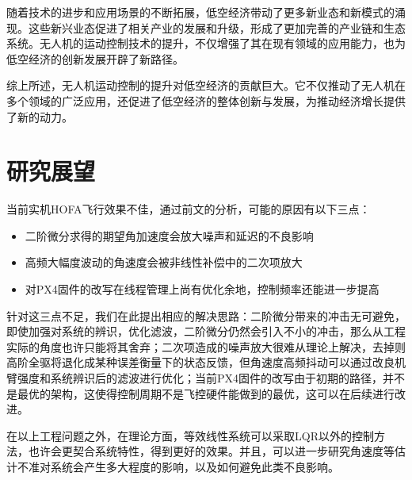 随着技术的进步和应用场景的不断拓展，低空经济带动了更多新业态和新模式的涌现。这些新兴业态促进了相关产业的发展和升级，形成了更加完善的产业链和生态系统。无人机的运动控制技术的提升，不仅增强了其在现有领域的应用能力，也为低空经济的创新发展开辟了新路径。

综上所述，无人机运动控制的提升对低空经济的贡献巨大。它不仅推动了无人机在多个领域的广泛应用，还促进了低空经济的整体创新与发展，为推动经济增长提供了新的动力。
\section{研究展望}
当前实机HOFA飞行效果不佳，通过前文的分析，可能的原因有以下三点：
\begin{itemize}
  \item 二阶微分求得的期望角加速度会放大噪声和延迟的不良影响
  \item 高频大幅度波动的角速度会被非线性补偿中的二次项放大
  \item 对PX4固件的改写在线程管理上尚有优化余地，控制频率还能进一步提高
\end{itemize}
针对这三点不足，我们在此提出相应的解决思路：二阶微分带来的冲击无可避免，即使加强对系统的辨识，优化滤波，二阶微分仍然会引入不小的冲击，那么从工程实际的角度也许只能将其舍弃；二次项造成的噪声放大很难从理论上解决，去掉则高阶全驱将退化成某种误差衡量下的状态反馈，但角速度高频抖动可以通过改良机臂强度和系统辨识后的滤波进行优化；当前PX4固件的改写由于初期的路径，并不是最优的架构，这使得控制周期不是飞控硬件能做到的最优，这可以在后续进行改进。

在以上工程问题之外，在理论方面，等效线性系统可以采取LQR以外的控制方法，也许会更契合系统特性，得到更好的效果。并且，可以进一步研究角速度等估计不准对系统会产生多大程度的影响，以及如何避免此类不良影响。